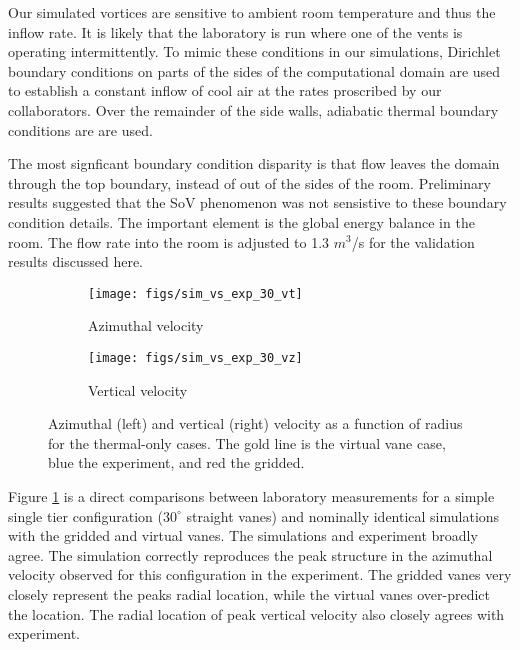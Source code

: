 Our simulated vortices are sensitive to ambient room temperature and thus 
the inflow rate. It is likely that the laboratory is run where one of
the vents is operating intermittently. 
To mimic these conditions in our simulations, Dirichlet boundary conditions 
on parts of the sides of the computational domain are used to
establish a constant inflow of cool air at the rates 
proscribed by our collaborators. Over the remainder of the side walls, 
adiabatic thermal boundary conditions are are used. 

The most signficant boundary condition disparity is that flow leaves the
domain through the top boundary, instead of out of the sides of the
room. Preliminary results suggested that the SoV phenomenon  was not
sensistive to these boundary condition details. The important element is
the  global energy balance in the room. The flow rate into the room is
adjusted to  1.3 $m^3$/s for the validation results discussed here.  


\begin{figure}[]

 \begin{subfigure}{.5\textwidth}
  \centering
  \texttt{[image: figs/sim\_vs\_exp\_30\_vt]}
  \caption{Azimuthal velocity}
 \end{subfigure}%
 \begin{subfigure}{.5\textwidth}
  \centering
  \texttt{[image: figs/sim\_vs\_exp\_30\_vz]}%
  \caption{Vertical velocity} 
 \end{subfigure}%
  \caption{Azimuthal (left) and vertical (right) velocity 
 as a function of radius for the thermal-only cases. The gold line is
 the virtual vane case, blue the experiment, and red the gridded.} 
  \label{fig:val_lab}  
\end{figure}

Figure \ref{fig:val_lab} is a direct comparisons
between laboratory 
measurements for a simple single tier configuration ($30^{\circ}$
straight vanes) and nominally identical simulations with the gridded and
virtual vanes. The simulations and experiment broadly agree. The
simulation correctly reproduces the peak structure in the azimuthal
velocity observed for this configuration in the experiment. The gridded
vanes very closely represent the peaks radial location, while the
virtual vanes over-predict the location. The radial location of peak
vertical velocity also closely agrees with experiment.

